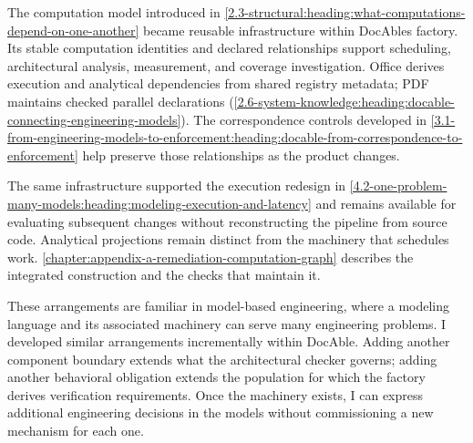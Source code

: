
The computation model introduced in \autoref{2.3-structural:heading:what-computations-depend-on-one-another} became reusable infrastructure within DocAble\textquotesingle s factory. Its stable computation identities and declared relationships support scheduling, architectural analysis, measurement, and coverage investigation. Office derives execution and analytical dependencies from shared registry metadata; PDF maintains checked parallel declarations (\autoref{2.6-system-knowledge:heading:docable-connecting-engineering-models}). The correspondence controls developed in \autoref{3.1-from-engineering-models-to-enforcement:heading:docable-from-correspondence-to-enforcement} help preserve those relationships as the product changes.

The same infrastructure supported the execution redesign in \autoref{4.2-one-problem-many-models:heading:modeling-execution-and-latency} and remains available for evaluating subsequent changes without reconstructing the pipeline from source code. Analytical projections remain distinct from the machinery that schedules work. \autoref{chapter:appendix-a-remediation-computation-graph} describes the integrated construction and the checks that maintain it.

These arrangements are familiar in model-based engineering, where a modeling language and its associated machinery can serve many engineering problems. I developed similar arrangements incrementally within DocAble. Adding another component boundary extends what the architectural checker governs; adding another behavioral obligation extends the population for which the factory derives verification requirements. Once the machinery exists, I can express additional engineering decisions in the models without commissioning a new mechanism for each one.

